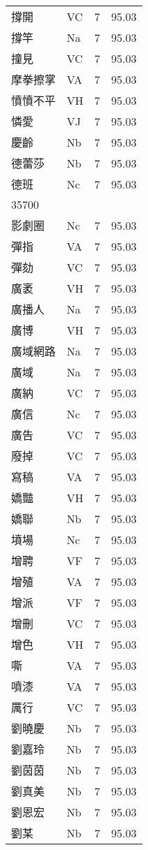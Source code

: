 \documentclass[twocolumn]{book}
\begin{document}
\begin{supertabular}{llrr}
撐開 & VC & 7 &  95.03\\
撐竿 & Na & 7 &  95.03\\
撞見 & VC & 7 &  95.03\\
摩拳擦掌 & VA & 7 &  95.03\\
憤憤不平 & VH & 7 &  95.03\\
憐愛 & VJ & 7 &  95.03\\
慶齡 & Nb & 7 &  95.03\\
德蕾莎 & Nb & 7 &  95.03\\
德班 & Nc & 7 &  95.03\\
35700\\
影劇圈 & Nc & 7 &  95.03\\
彈指 & VA & 7 &  95.03\\
彈劾 & VC & 7 &  95.03\\
廣袤 & VH & 7 &  95.03\\
廣播人 & Na & 7 &  95.03\\
廣博 & VH & 7 &  95.03\\
廣域網路 & Na & 7 &  95.03\\
廣域 & Na & 7 &  95.03\\
廣納 & VC & 7 &  95.03\\
廣信 & Nc & 7 &  95.03\\
廣告 & VC & 7 &  95.03\\
廢掉 & VC & 7 &  95.03\\
寫稿 & VA & 7 &  95.03\\
嬌豔 & VH & 7 &  95.03\\
嬌聯 & Nb & 7 &  95.03\\
墳場 & Nc & 7 &  95.03\\
增聘 & VF & 7 &  95.03\\
增殖 & VA & 7 &  95.03\\
增派 & VF & 7 &  95.03\\
增刪 & VC & 7 &  95.03\\
增色 & VH & 7 &  95.03\\
嘶 & VA & 7 &  95.03\\
噴漆 & VA & 7 &  95.03\\
厲行 & VC & 7 &  95.03\\
劉曉慶 & Nb & 7 &  95.03\\
劉嘉玲 & Nb & 7 &  95.03\\
劉茵茵 & Nb & 7 &  95.03\\
劉真美 & Nb & 7 &  95.03\\
劉恩宏 & Nb & 7 &  95.03\\
劉某 & Nb & 7 &  95.03\\

\end{supertabular}
\end{document}
